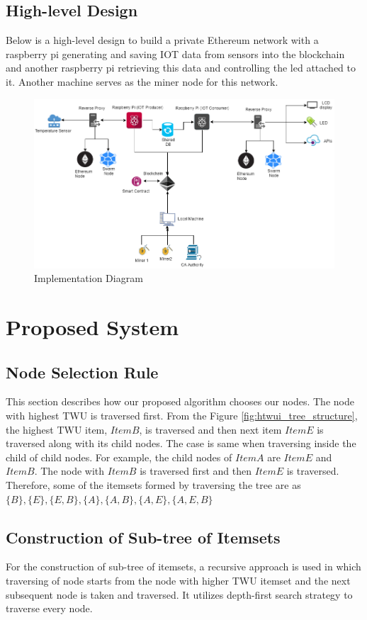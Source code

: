 \documentclass[11pt,openright]{report}
\begin{document}
\subsection{High-level Design} \label{ss:construct_architecture}
Below is a high-level design to build a private Ethereum network with a raspberry pi generating and saving IOT data from sensors into the blockchain and another raspberry pi retrieving this data and controlling the led attached to it. Another machine serves as the miner node for this network.
\begin{figure}
	\centering
	\includegraphics[scale=0.5]{images/Final_Implementation.png}
	\caption{Implementation Diagram}
	\label{fig:impldiagram_architechture}
\end{figure}
\section{Proposed System}


\subsection{Node Selection Rule} {
	This section describes how our proposed algorithm chooses our nodes. The node with highest TWU is traversed first. From the Figure \ref{fig:htwui_tree_structure}, the highest TWU item, $Item B$, is traversed and then next item $Item E$ is traversed along with its child nodes. The case is same when traversing inside the child of child nodes. For example, the child nodes of $Item A$ are $Item E$ and $Item B$. The node with $Item B$ is traversed first and then $Item E$ is traversed. Therefore, some of the itemsets formed by traversing the tree are as  $\{B\}, \{E\}, \{E,B\}, \{A\},\{A,B\}, \{A,E\}, \{A,E,B\}$
}

\subsection{Construction of Sub-tree of Itemsets} \label{ss:sub-tree-itemsets}
For the construction of sub-tree of itemsets, a recursive approach is used in which traversing of node starts from the node with higher TWU itemset and the next subsequent node is taken and traversed. It utilizes depth-first search strategy to traverse every node.
\end{document}

